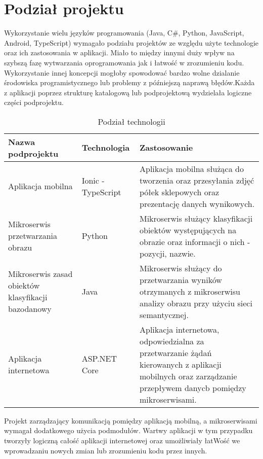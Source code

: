 \section{Podział projektu}
{Wykorzystanie wielu języków programowania (Java, C\#, Python, JavaScript, Android, TypeScript) wymagało podziału projektów ze względu użyte technologie oraz ich zastosowania w aplikacji. Miało to między innymi duży wpływ na szybszą fazę wytwarzania oprogramowania jak i łatwość w zrozumieniu kodu. Wykorzystanie innej koncepcji mogłoby spowodować bardzo wolne dzialanie środowiska programistycznego lub problemy z późniejszą naprawą błędów.Każda z aplikacji poprzez strukturę katalogową lub podprojektową wydzielała logiczne części podprojektu.	
		\begin{table}[htbp]
		\caption{Podział technologii}
		\label{sys-architecture}
		\begin{center}
			\begin{tabular}{ | p{4cm}| p{3cm} | p{6cm} |}
				\hline Nazwa podprojektu & Technologia &  Zastosowanie \\ \hline   
				\hline  Aplikacja mobilna &  Ionic - TypeScript & Aplikacja mobilna służąca do tworzenia oraz przesyłania zdjęć półek sklepowych oraz prezentację danych wynikowych.\\ \hline
				
				\hline  Mikroserwis przetwarzania obrazu & Python & Mikroserwis służący klasyfikacji obiektów występujących na obrazie oraz informacji o nich - pozycji, nazwie.\\ \hline
				
				\hline Mikroserwis zasad obiektów klasyfikacji  \mbox{bazodanowy} & Java & Mikroserwis służący do przetwarzania wyników otrzymanych z mikroserwisu analizy obrazu przy użyciu sieci semantycznej.\\ \hline
				
				\hline Aplikacja internetowa & ASP.NET Core & Aplikacja internetowa, odpowiedzialna za przetwarzanie żądań kierowanych z aplikacji mobilnych oraz zarządzanie przepływem danycb pomiędzy mikroserwisami.\\ \hline
			\end{tabular}
		\end{center}
	\end{table}	
	
	
Projekt zarządzający komunikacją pomiędzy aplikacją mobilną, a mikroserwisami wymagał dodatkowego użycia podmodułów. Wartwy aplikacji w tym przypadku tworzyły logiczną całość aplikacji internetowej oraz umożliwiały łatWość we wprowadzaniu nowych zmian lub zrozumieniu kodu przez innych.


}
